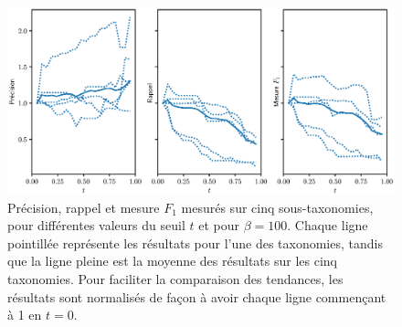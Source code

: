 \begin{figure}[h]
    \centering
    \includegraphics[width=\textwidth]{fig/plot/threshold_breakdown_avg_no_event.eps}
    \caption[Influence du seuil de probabilité sur l'extraction de taxonomie pour $\beta=100$]{Précision, rappel et mesure $F_1$ mesurés sur cinq sous-taxonomies, pour différentes valeurs du seuil $t$ et pour $\beta=100$. Chaque ligne pointillée représente les résultats pour l'une des taxonomies, tandis que la ligne pleine est la moyenne des résultats sur les cinq taxonomies. Pour faciliter la comparaison des tendances, les résultats sont normalisés de façon à avoir chaque ligne commençant à 1 en $t = 0$.}
    \label{fig:threshold-search-1}
\end{figure}

